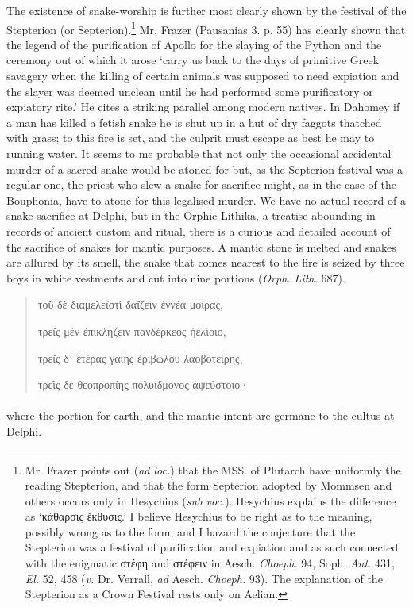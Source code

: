 \documentclass[a4paper, 11pt, oneside, polutonikogreek, english]{article}
\begin{document}
The existence of snake-worship is further most clearly shown by the festival of the Stepterion (or Septerion).\footnote{Mr. Frazer points out (\emph{ad loc.}) that the MSS. of Plutarch have uniformly the reading Stepterion, and that the form Septerion adopted by Mommsen and others occurs only in Hesychius (\emph{sub voc.}). Hesychius explains the difference as `κάθαρσις ἔκθυσις.' I believe Hesychius to be right as to the meaning, possibly wrong as to the form, and I hazard the conjecture that the Stepterion was a festival of purification and expiation and as such connected with the enigmatic στέφη and στέφειν in Aesch. \emph{Choeph.} 94, Soph. \emph{Ant.} 431, \emph{El.} 52, 458 (\emph{v.} Dr. Verrall, \emph{ad} Aesch. \emph{Choeph.} 93). The explanation of the Stepterion as a Crown Festival rests only on Aelian.} Mr. Frazer (Pausanias 3. p. 55) has clearly shown that the legend of the purification of Apollo for the slaying of the Python and the ceremony out of which it arose `carry us back to the days of primitive Greek savagery when the killing of certain animals was supposed to need expiation and the slayer was deemed unclean until he had performed some purificatory or expiatory rite.' He cites a striking parallel among modern natives. In Dahomey if a man has killed a fetish snake he is shut up in a hut of dry faggots thatched with grass; to this fire is set, and the culprit must escape as best he may to running water. It seems to me probable that not only the occasional accidental murder of a sacred snake would be atoned for but, as the Septerion festival was a regular one, the priest who slew a snake for sacrifice might, as in the case of the Bouphonia, have to atone for this legalised murder. We have no actual record of a snake-sacrifice at Delphi, but in the Orphic Lithika, a treatise abounding in records of ancient custom and ritual, there is a curious and detailed account of the sacrifice of snakes for mantic purposes. A mantic stone is melted and snakes are allured by its smell, the snake that comes nearest to the fire is seized by three boys in white vestments and cut into nine portions (\emph{Orph. Lith.} 687).
\begin{quotation}
τοῦ δὲ διαμελεϊστὶ δαΐζειν ἐννέα μοίρας,

τρεῖς μὲν ἐπικλήζειν πανδέρκεος ἠελίοιο,

τρεῖς δ᾽ ἑτέρας γαίης ἐριβώλου λαοβοτείρης,

τρεῖς δὲ θεοπροπίης πολυίδμονος ἀψεύστοιο·
\end{quotation}
\paragraph{}
where the portion for earth, and the mantic intent are germane to the cultus at Delphi.
\end{document}
